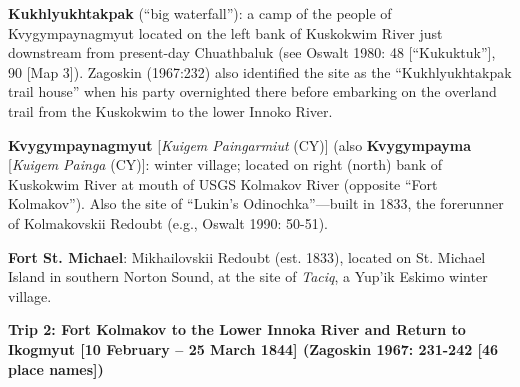 \begin{hang}
\textbf{Kukhlyukhtakpak} (“big waterfall”): a camp of the people of Kvygympaynagmyut located on the left bank of Kuskokwim River just downstream from present-day Chuathbaluk (see Oswalt 1980: 48 [“Kukuktuk”], 90 [Map 3]). Zagoskin (1967:232) also identified the site as the “Kukhlyukhtakpak trail house” when his party overnighted there before embarking on the overland trail from the Kuskokwim to the lower Innoko River.



\textbf{Kvygympaynagmyut} [\textit{Kuigem Paingarmiut} (CY)] (also \textbf{Kvygympayma} [\textit{Kuigem Painga} (CY)]: winter village; located on right (north) bank of Kuskokwim River at mouth of USGS Kolmakov River (opposite “Fort Kolmakov”). Also the site of “Lukin’s Odinochka”—built in 1833, the forerunner of Kolmakovskii Redoubt (e.g., Oswalt 1990: 50-51).



\textbf{Fort St. Michael}: Mikhailovskii Redoubt (est. 1833), located on St. Michael Island in southern Norton Sound, at the site of \textit{Taciq}, a Yup’ik Eskimo winter village.

\end{hang}


\vspace{1cm}
\noindent
\textbf{Trip 2: Fort Kolmakov to the Lower Innoka River and Return to Ikogmyut [10 February – 25 March 1844] (Zagoskin 1967: 231-242 [46 place names])}
\vspace{6pt}

